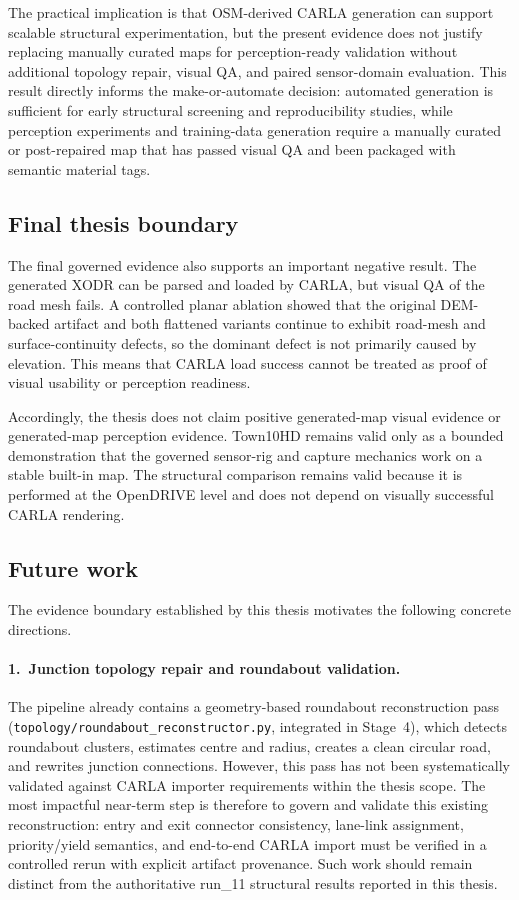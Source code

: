 The practical implication is that OSM-derived CARLA generation can support scalable structural experimentation, but the present evidence does not justify replacing manually curated maps for perception-ready validation without additional topology repair, visual QA, and paired sensor-domain evaluation. This result directly informs the make-or-automate decision: automated generation is sufficient for early structural screening and reproducibility studies, while perception experiments and training-data generation require a manually curated or post-repaired map that has passed visual QA and been packaged with semantic material tags.

\subsection{Final thesis boundary}
The final governed evidence also supports an important negative result. The generated XODR can be parsed and loaded by CARLA, but visual QA of the road mesh fails. A controlled planar ablation showed that the original DEM-backed artifact and both flattened variants continue to exhibit road-mesh and surface-continuity defects, so the dominant defect is not primarily caused by elevation. This means that CARLA load success cannot be treated as proof of visual usability or perception readiness.

Accordingly, the thesis does not claim positive generated-map visual evidence or generated-map perception evidence. Town10HD remains valid only as a bounded demonstration that the governed sensor-rig and capture mechanics work on a stable built-in map. The structural comparison remains valid because it is performed at the OpenDRIVE level and does not depend on visually successful CARLA rendering.

\subsection{Future work}
\label{sec:future_work}

The evidence boundary established by this thesis motivates the following concrete directions.

\paragraph{1.\ Junction topology repair and roundabout validation.}
The pipeline already contains a geometry-based roundabout reconstruction pass (\texttt{topology/roundabout\_reconstructor.py}, integrated in Stage~4), which detects roundabout clusters, estimates centre and radius, creates a clean circular road, and rewrites junction connections. However, this pass has not been systematically validated against CARLA importer requirements within the thesis scope. The most impactful near-term step is therefore to govern and validate this existing reconstruction: entry and exit connector consistency, lane-link assignment, priority/yield semantics, and end-to-end CARLA import must be verified in a controlled rerun with explicit artifact provenance. Such work should remain distinct from the authoritative run\_11 structural results reported in this thesis.

